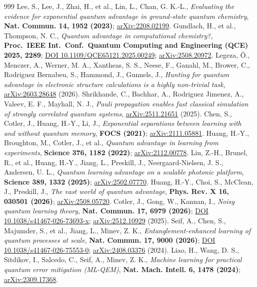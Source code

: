 \documentclass[onecolumn,a4paper]{quantumarticle}
\begin{document}
\begin{thebibliography}{999}
 Lee, S., Lee, J., Zhai, H., et al., Lin, L., Chan, G. K.-L., \emph{Evaluating the evidence for exponential quantum advantage in ground-state quantum chemistry}, \textbf{Nat. Commun. 14, 1952 (2023)}; \href{https://arxiv.org/abs/2208.02199}{arXiv:2208.02199}.
 Gundlach, H., et al., Thompson, N. C., \emph{Quantum advantage in computational chemistry?}, \textbf{Proc.\ IEEE Int.\ Conf.\ Quantum Computing and Engineering (QCE) 2025, 2289}; \href{https://doi.org/10.1109/QCE65121.2025.00249}{DOI 10.1109/QCE65121.2025.00249}; \href{https://arxiv.org/abs/2508.20972}{arXiv:2508.20972}.
 Legeza, Ö., Menczer, A., Werner, M. A., Xantheas, S. S., Neese, F., Ganahl, M., Brower, C., Rodriguez Bernabeu, S., Hammond, J., Gunnels, J., \emph{Hunting for quantum advantage in electronic structure calculations is a highly non-trivial task}, \href{https://arxiv.org/abs/2603.28648}{arXiv:2603.28648} (2026).
 Shrikhande, C., Bachhar, A., Rodriguez Jimenez, A., Valeev, E. F., Mayhall, N. J., \emph{Pauli propagation enables fast classical simulation of strongly correlated quantum systems}, \href{https://arxiv.org/abs/2511.21651}{arXiv:2511.21651} (2025).
 Chen, S., Cotler, J., Huang, H.-Y., Li, J., \emph{Exponential separations between learning with and without quantum memory}, \textbf{FOCS (2021)}; \href{https://arxiv.org/abs/2111.05881}{arXiv:2111.05881}.
 Huang, H.-Y., Broughton, M., Cotler, J., et al., \emph{Quantum advantage in learning from experiments}, \textbf{Science 376, 1182 (2022)}; \href{https://arxiv.org/abs/2112.00778}{arXiv:2112.00778}.
 Liu, Z.-H., Brunel, R., et al., Huang, H.-Y., Jiang, L., Preskill, J., Neergaard-Nielsen, J. S., Andersen, U. L., \emph{Quantum learning advantage on a scalable photonic platform}, \textbf{Science 389, 1332 (2025)}; \href{https://arxiv.org/abs/2502.07770}{arXiv:2502.07770}.
 Huang, H.-Y., Choi, S., McClean, J., Preskill, J., \emph{The vast world of quantum advantage}, \textbf{Phys. Rev. X 16, 030501 (2026)}; \href{https://arxiv.org/abs/2508.05720}{arXiv:2508.05720}.
 Cotler, J., Gong, W., Kannan, I., \emph{Noisy quantum learning theory}, \textbf{Nat. Commun. 17, 6979 (2026)}; \href{https://doi.org/10.1038/s41467-026-73693-x}{DOI 10.1038/s41467-026-73693-x}; \href{https://arxiv.org/abs/2512.10929}{arXiv:2512.10929} (2025).
 Seif, A., Chen, S., Majumder, S., et al., Jiang, L., Minev, Z. K., \emph{Entanglement-enhanced learning of quantum processes at scale}, \textbf{Nat. Commun. 17, 9000 (2026)}; \href{https://doi.org/10.1038/s41467-026-75553-0}{DOI 10.1038/s41467-026-75553-0}; \href{https://arxiv.org/abs/2408.03376}{arXiv:2408.03376} (2024).
 Liao, H., Wang, D. S., Sitdikov, I., Salcedo, C., Seif, A., Minev, Z. K., \emph{Machine learning for practical quantum error mitigation (ML-QEM)}, \textbf{Nat. Mach. Intell. 6, 1478 (2024)}; \href{https://arxiv.org/abs/2309.17368}{arXiv:2309.17368}.
\end{thebibliography}
\endgroup
\end{document}
